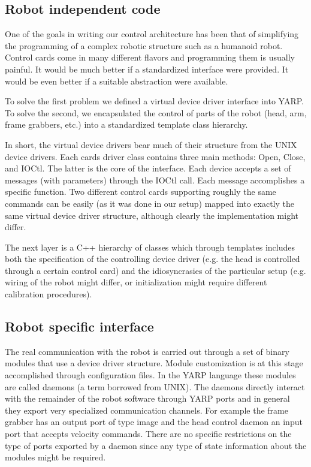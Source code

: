 \subsection{Robot independent code}

One of the goals in writing our control architecture has been that of
simplifying the programming of a complex robotic structure such as a
humanoid robot. Control cards come in many different flavors and
programming them is usually painful. It would be much better if a
standardized interface were provided. It would be even better if a
suitable abstraction were available.

To solve the first problem we defined a virtual device driver
interface into YARP. To solve the second, we encapsulated the control
of parts of the robot (head, arm, frame grabbers, etc.) into a
standardized template class hierarchy.

In short, the virtual device drivers bear much of their structure from
the UNIX device drivers. Each cards driver class contains three main
methods: Open, Close, and IOCtl. The latter is the core of the
interface. Each device accepts a set of messages (with parameters)
through the IOCtl call. Each message accomplishes a specific
function. Two different control cards supporting roughly the same
commands can be easily (as it was done in our setup) mapped into
exactly the same virtual device driver structure, although clearly the
implementation might differ.

The next layer is a C++ hierarchy of classes which through templates
includes both the specification of the controlling device driver
(e.g. the head is controlled through a certain control card) and the
idiosyncrasies of the particular setup (e.g. wiring of the robot might
differ, or initialization might require different calibration
procedures). 


\subsection{Robot specific interface}

The real communication with the robot is carried out through a set of
binary modules that use a device driver structure. Module
customization is at this stage accomplished through configuration
files. In the YARP language these modules are called daemons (a term
borrowed from UNIX). The daemons directly interact with the remainder
of the robot software through YARP ports and in general they export
very specialized communication channels. For example the frame grabber
has an output port of type image and the head control daemon an input
port that accepts velocity commands. There are no specific
restrictions on the type of ports exported by a daemon since any type
of state information about the modules might be required.

